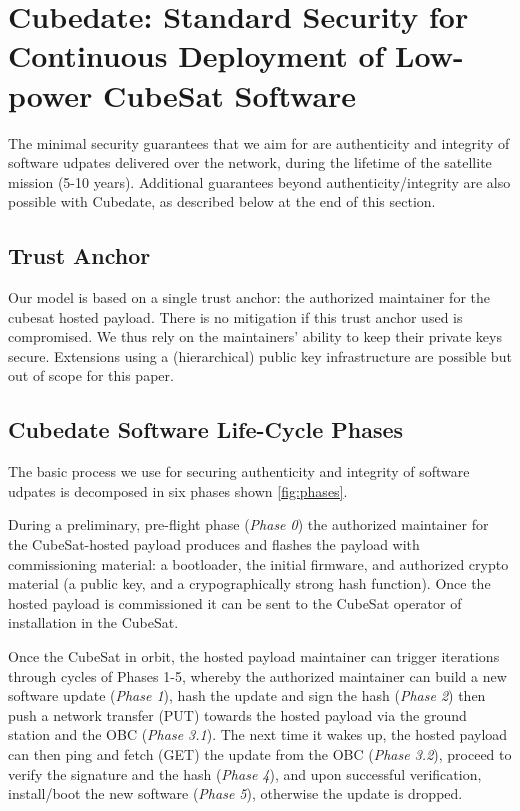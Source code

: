 \section{Cubedate: Standard Security for Continuous Deployment of Low-power CubeSat Software}
\label{sec:low-power-orbital-communication-arch}


The minimal security guarantees that we aim for are authenticity and integrity of software udpates delivered over the network, during the lifetime of the satellite mission (5-10 years).
Additional guarantees beyond authenticity/integrity are also possible with Cubedate, as described below at the end of this section.

\subsection{Trust Anchor}
Our model is based on a single trust anchor: the authorized maintainer for the cubesat hosted payload.
There is no mitigation if this trust anchor used is compromised. 
We thus rely on the maintainers' ability to keep their private keys secure. 
Extensions using a (hierarchical) public key infrastructure are possible but out of scope for this paper.

\subsection{Cubedate Software Life-Cycle Phases}
The basic process we use for securing authenticity and integrity of software udpates is decomposed in six phases shown \autoref{fig:phases}. 

During a preliminary, pre-flight phase (\textit{Phase 0}) the authorized maintainer for the CubeSat-hosted payload
produces and flashes the payload with commissioning material:
a bootloader, the initial firmware, and authorized crypto material (a public key, and a crypographically strong hash function).
Once the hosted payload is commissioned it can be sent to the CubeSat operator of installation in the CubeSat.

Once the CubeSat in orbit, the hosted payload maintainer can trigger iterations through cycles of Phases 1-5, whereby
the authorized maintainer can build a new software update (\textit{Phase 1}), hash the update
and sign the hash (\textit{Phase 2}) then push a network transfer (PUT) towards the hosted payload via the ground station and the OBC (\textit{Phase 3.1}). The next time it wakes up, the hosted payload can
then ping and fetch (GET) the update from the OBC (\textit{Phase 3.2}), proceed to verify the signature and the hash (\textit{Phase 4}),
and upon successful verification, install/boot the new software (\textit{Phase 5}), otherwise the update is dropped.

